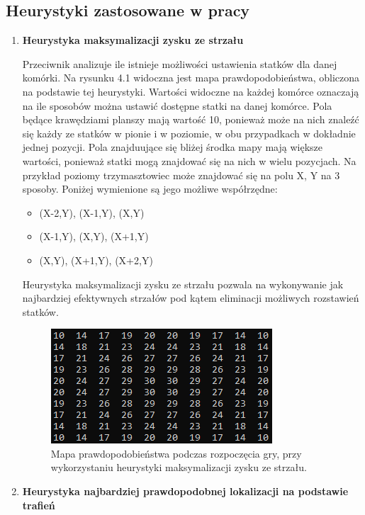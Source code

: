 \subsection{Heurystyki zastosowane w pracy}
\begin{enumerate}
  \item \textbf{Heurystyka maksymalizacji zysku ze strzału}
  
   Przeciwnik analizuje ile istnieje możliwości ustawienia statków dla danej komórki. Na rysunku 4.1 widoczna jest mapa prawdopodobieństwa, obliczona na podstawie tej heurystyki. Wartości widoczne na każdej komórce oznaczają na ile sposobów można ustawić dostępne statki na danej komórce. Pola będące krawędziami planszy mają wartość 10, ponieważ może na nich znaleźć się każdy ze statków w pionie i w poziomie, w obu przypadkach w dokładnie jednej pozycji. Pola znajduujące się bliżej środka mapy mają większe wartości, ponieważ statki mogą znajdować się na nich w wielu pozycjach. Na przykład poziomy trzymasztowiec może znajdować się na polu X, Y na 3 sposoby. Poniżej wymienione są jego możliwe współrzędne:
  \begin{itemize}
      \item (X-2,Y), (X-1,Y), (X,Y)
      \item (X-1,Y), (X,Y), (X+1,Y)
      \item (X,Y), (X+1,Y), (X+2,Y)
  \end{itemize}

  Heurystyka maksymalizacji zysku ze strzału pozwala na wykonywanie jak najbardziej efektywnych strzałów pod kątem eliminacji możliwych rozstawień statków.
  
  
  \begin{figure}[!h]
    \label{fig:mapa-prawdopodobienstwa-heurystyka-max-zysku}
    \centering \includegraphics[width=0.5\linewidth]{img/probabilityMapStart.PNG}
    \caption{Mapa prawdopodobieństwa podczas rozpoczęcia gry, przy wykorzystaniu heurystyki maksymalizacji zysku ze strzału.}
\end{figure}
  
  \item \textbf{Heurystyka najbardziej prawdopodobnej lokalizacji na podstawie trafień}


\end{enumerate}
